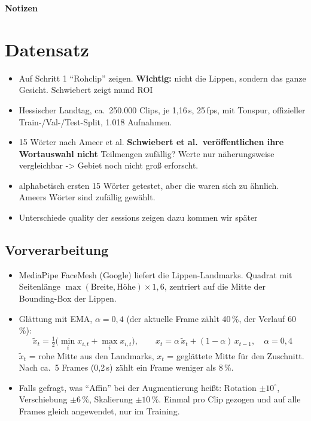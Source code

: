 \documentclass[11pt,a4paper]{article}
\newcommand{\achtung}[1]{{\color{uzhockerrot100}\textbf{#1}}}
\begin{document}
{\color{bwkiblau}\huge\bfseries Notizen}\\[0.2cm]

\section{Datensatz}

\begin{itemize}
  \item Auf Schritt 1 \enquote{Rohclip} zeigen. \achtung{Wichtig:} nicht die
        Lippen, sondern das ganze Gesicht. Schwiebert zeigt mund ROI
  \item Hessischer Landtag, ca.\ 250.000 Clips, je 1,16\,s, 25\,fps, mit Tonspur, offizieller Train-/Val-/Test-Split, 1.018 Aufnahmen.
  \item 15 Wörter nach Ameer et al. \achtung{Schwiebert et al.\ veröffentlichen ihre Wortauswahl nicht} Teilmengen zufällig?  Werte nur näherungsweise vergleichbar -> Gebiet noch nicht groß erforscht.
  \item alphabetisch ersten 15 Wörter getestet, aber die waren sich zu ähnlich. Ameers Wörter sind zufällig gewählt.
  \item Unterschiede quality der sessions zeigen dazu kommen wir später
\end{itemize}

\subsection{Vorverarbeitung}
\begin{itemize}
  \item MediaPipe FaceMesh (Google) liefert die Lippen-Landmarks. Quadrat mit Seitenlänge
        $\max(\text{Breite}, \text{Höhe}) \times 1{,}6$, zentriert auf die Mitte der Bounding-Box
        der Lippen.
  \item Glättung mit EMA, $\alpha = 0{,}4$ (der aktuelle Frame zählt 40\,\%, der Verlauf 60\,\%):
        \[
          \tilde{x}_t = \tfrac{1}{2}\bigl(\min_i x_{i,t} + \max_i x_{i,t}\bigr),\qquad
          x_t = \alpha\,\tilde{x}_t + (1-\alpha)\,x_{t-1},\quad \alpha = 0{,}4
        \]
        $\tilde{x}_t$ = rohe Mitte aus den Landmarks, $x_t$ = geglättete Mitte für den Zuschnitt.
        Nach ca.\ 5 Frames (0,2\,s) zählt ein Frame weniger als 8\,\%.
  \item Falls gefragt, was \enquote{Affin} bei der Augmentierung heißt: Rotation $\pm10^\circ$,
        Verschiebung $\pm6\,\%$, Skalierung $\pm10\,\%$. Einmal pro Clip gezogen und auf alle
        Frames gleich angewendet, nur im Training.
\end{itemize}
\end{document}
